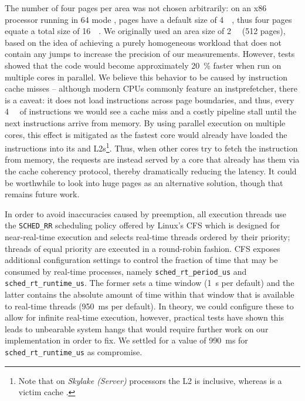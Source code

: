 The number of four pages per area was not chosen arbitrarily: on an \gls{x86} processor running in \SI{64}{\bit} mode \cite{intelsdmsysprogguide}, pages have a default size of \SI{4}{\kibi\byte}, thus four pages equate a total size of \SI{16}{\kibi\byte}. We originally used an area size of \SI{2}{\mebi\byte} (512 pages), based on the idea of achieving a purely homogeneous workload that does not contain any jumps to increase the precision of our measurements. However, tests showed that the code would become approximately \SI{20}{\percent} faster when run on multiple cores in parallel. We believe this behavior to be caused by instruction cache misses -- although modern \glspl{CPU} commonly feature an \gls{instprefetcher}, there is a caveat: it does not load instructions across page boundaries, and thus, every \SI{4}{\kibi\byte} of instructions we would see a cache miss and a costly pipeline stall until the next instructions arrive from memory. By using parallel execution on multiple cores, this effect is mitigated as the fastest core would already have loaded the instructions into its  and \glspl{L2}\footnote{Note that on \textit{Skylake (Server)} processors the \gls{L2} is inclusive, whereas  is a victim cache \cite{intelxeonscalabledeepdive}.}. Thus, when other cores try to fetch the instruction from memory, the requests are instead served by a core that already has them via the cache coherency protocol, thereby dramatically reducing the latency. It could be worthwhile to look into huge pages as an alternative solution, though that remains future work.

In order to avoid inaccuracies caused by preemption, all execution threads use the \texttt{SCHED\_RR} scheduling policy offered by \gls{Linux}'s \gls{CFS} \cite{cfs} which is designed for near-real-time execution and selects real-time threads ordered by their priority; threads of equal priority are executed in a round-robin fashion. \gls{CFS} exposes additional configuration settings \cite{cfsrt} to control the fraction of time that may be consumed by real-time processes, namely \texttt{sched\_rt\_period\_us} and \texttt{sched\_rt\_runtime\_us}. The former sets a time window (\SI{1}{\second} per default) and the latter contains the absolute amount of time within that window that is available to real-time threads (\SI{950}{\milli\second} per default). In theory, we could configure these to allow for infinite real-time execution, however, practical tests have shown this leads to unbearable system hangs that would require further work on our implementation in order to fix. We settled for a value of \SI{990}{\milli\second} for \texttt{sched\_rt\_runtime\_us} as compromise.

